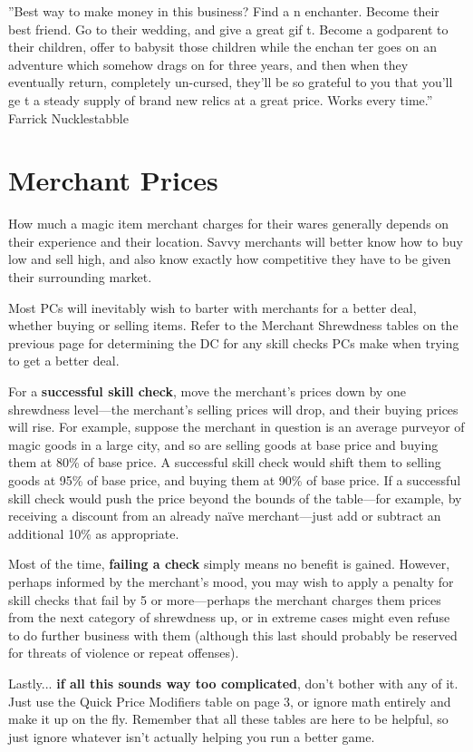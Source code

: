 \documentclass[10pt,a4paper,twoside,bg=print,twocolumn,openany,nodeprecatedcode]{dndbook}
\begin{document}
\DndQuote%
{}
{''Best way to make money in this business? Find a n enchanter. Become their best friend. Go to their wedding, and give a great gif t. Become a godparent to their children, offer to babysit those children while the enchan ter goes on an adventure which somehow drags on for three years, and then when they eventually return, completely un-cursed, they'll be so grateful to you that you'll ge t a steady supply of brand new relics at a great price. Works every time.''}
{Farrick Nucklestabble}
\section{Merchant Prices}
How much a magic item merchant charges for their wares generally depends on their experience and their location. Savvy merchants will better know how to buy low and sell high, and also know exactly how competitive they have to be given their surrounding market.

Most PCs will inevitably wish to barter with merchants for a better deal, whether buying or selling items. Refer to the Merchant Shrewdness tables on the previous page for determining the DC for any skill checks PCs make when trying to get a better deal.

For a \textbf{successful skill check}, move the merchant's prices down by one shrewdness level—the merchant's selling prices will drop, and their buying prices will rise. For example, suppose the merchant in question is an average purveyor of magic goods in a large city, and so are selling goods at base price and buying them at 80\% of base price. A successful skill check would shift them to selling goods at 95\% of base price, and buying them at 90\% of base price. If a successful skill check would push the price beyond the bounds of the table—for example, by receiving a discount from an already naïve merchant—just add or subtract an additional 10\% as appropriate.

Most of the time, \textbf{failing a check} simply means no benefit is gained. However, perhaps informed by the merchant's mood, you may wish to apply a penalty for skill checks that fail by 5 or more—perhaps the merchant charges them prices from the next category of shrewdness up, or in extreme cases might even refuse to do further business with them (although this last should probably be reserved for threats of violence or repeat offenses).

Lastly... \textbf{if all this sounds way too complicated}, don't bother with any of it. Just use the Quick Price Modifiers table on page 3, or ignore math entirely and make it up on the fly. Remember that all these tables are here to be helpful, so just ignore whatever isn't actually helping you run a better game.
\end{document}
